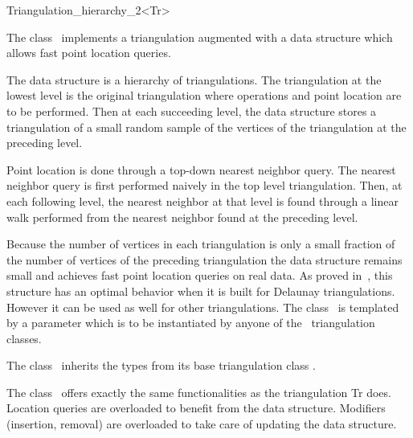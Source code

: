 

\begin{ccRefClass}{Triangulation_hierarchy_2<Tr>}

\ccDefinition
The class \ccRefName\ implements a triangulation augmented with
a data structure which allows fast point location queries.

The data structure is a hierarchy 
of triangulations. The triangulation at the lowest level is
the original triangulation where operations and point location are to 
be performed.
Then at each succeeding level, the data structure
stores a triangulation of a small random sample of the vertices
of the triangulation at the preceding level. 

Point location
is done through a top-down nearest neighbor query.
The nearest neighbor query is first
performed naively in the top level triangulation.
Then, at each following level, the nearest neighbor at that level
is found through a linear walk performed from
the nearest neighbor found at the preceding level.

Because the number of vertices in each triangulation is only a small
fraction of the number of vertices of the preceding triangulation 
the data structure remains small and achieves fast point location 
queries on real
data. As proved in~\cite{d-iirdt-98}, this structure has an optimal behavior
when it is built for Delaunay triangulations.
However it can be used as well for other triangulations.
The class \ccRefName\ is templated by a parameter
which is to be instantiated by anyone of the \cgal\ triangulation
classes.


\ccInheritsFrom
{}

\ccTypes
The class \ccRefName\ inherits the types from its base triangulation
class . 

The class \ccRefName\ offers exactly the same functionalities
as the triangulation Tr does.
Location queries are overloaded to benefit from the
data structure. Modifiers (insertion, removal) are overloaded
to take care of updating the data structure.


\end{ccRefClass}
